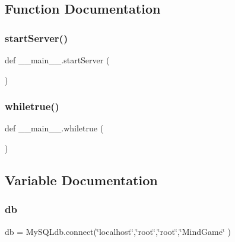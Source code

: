\subsection{Function Documentation}
\hypertarget{namespace____main_____a2b75075b3fab588340f99971f29de8da}{}\label{namespace____main_____a2b75075b3fab588340f99971f29de8da} 
\subsubsection{\texorpdfstring{start\+Server()}{startServer()}}
{\footnotesize\ttfamily def \+\_\+\+\_\+main\+\_\+\+\_\+.\+start\+Server (\begin{DoxyParamCaption}{ }\end{DoxyParamCaption})}

\hypertarget{namespace____main_____a5cd663b7efff8164ad13f39d2f577eee}{}\label{namespace____main_____a5cd663b7efff8164ad13f39d2f577eee} 
\subsubsection{\texorpdfstring{whiletrue()}{whiletrue()}}
{\footnotesize\ttfamily def \+\_\+\+\_\+main\+\_\+\+\_\+.\+whiletrue (\begin{DoxyParamCaption}{ }\end{DoxyParamCaption})}



\subsection{Variable Documentation}
\hypertarget{namespace____main_____a89a7f6028a19c3dc081cc5f16eb53891}{}\label{namespace____main_____a89a7f6028a19c3dc081cc5f16eb53891} 
\subsubsection{\texorpdfstring{db}{db}}
{\footnotesize\ttfamily db = My\+S\+Q\+Ldb.\+connect(\char`\"{}localhost\char`\"{},\char`\"{}root\char`\"{},\char`\"{}root\char`\"{},\char`\"{}Mind\+Game\char`\"{} )}

